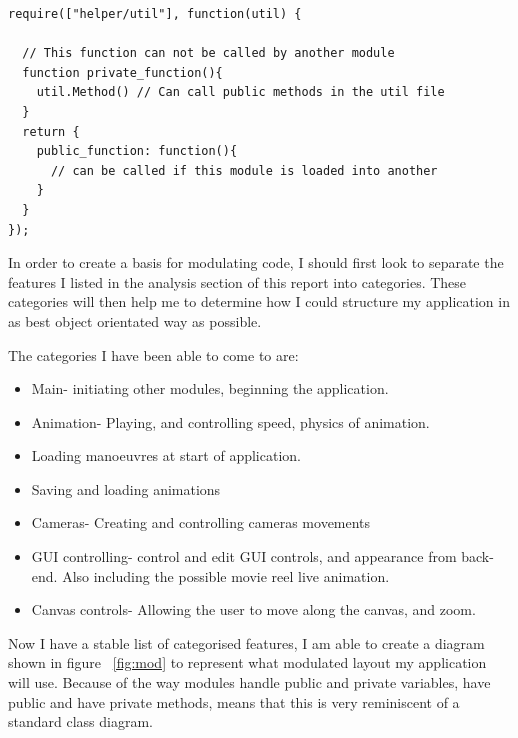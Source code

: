 \lstset{language=JavaScript}
\medskip
\begin{lstlisting}[caption=Example showing how RequireJS loads in another module or JavaScript file which in this case is loading up the util JavaScript module and naming it as object 'util' for use in the code]
require(["helper/util"], function(util) { 
  
  // This function can not be called by another module
  function private_function(){
    util.Method() // Can call public methods in the util file
  }
  return {
    public_function: function(){
      // can be called if this module is loaded into another
    }
  }
});
\end{lstlisting}
\label{fig:module}

In order to create a basis for modulating code, I should first look to separate the features I listed in the analysis section of this report into categories. These categories will then help me to determine how I could structure my application in as best object orientated way as possible.

The categories I have been able to come to are:
\begin{itemize}
  \item Main- initiating other modules, beginning the application.
  \item Animation- Playing, and controlling speed, physics of animation.
  \item Loading manoeuvres at start of application.
  \item Saving and loading animations
  \item Cameras- Creating and controlling cameras movements
  \item GUI controlling- control and edit GUI controls, and appearance from back-end. Also including the possible movie reel live animation.
  \item Canvas controls- Allowing the user to move along the canvas, and zoom.
\end{itemize}

Now I have a stable list of categorised features, I am able to create a diagram shown in figure ~\ref{fig:mod} to represent what modulated layout my application will use. Because of the way modules handle public and private variables, have public and have private methods, means that this is very reminiscent of a standard class diagram.

\clearpage

